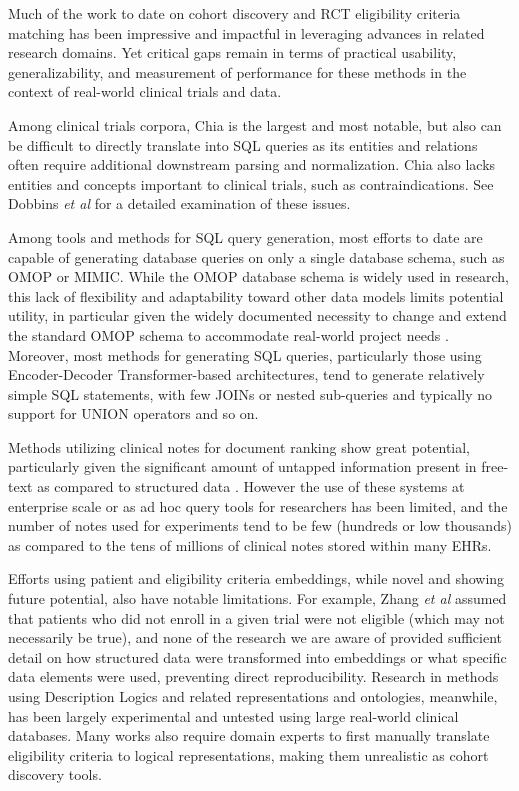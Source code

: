\documentclass[../main.tex]{subfiles}
\begin{document}
Much of the work to date on cohort discovery and RCT eligibility criteria matching has been impressive and impactful in leveraging advances in related research domains. Yet critical gaps remain in terms of practical usability, generalizability, and measurement of performance for these methods in the context of real-world clinical trials and data. 

Among clinical trials corpora, Chia is the largest and most notable, but also can be difficult to directly translate into SQL queries as its entities and relations often require additional downstream parsing and normalization. Chia also lacks entities and concepts important to clinical trials, such as contraindications. See Dobbins \textit{et al} \cite{dobbins2022leaf} for a detailed examination of these issues.

Among tools and methods for SQL query generation, most efforts to date are capable of generating database queries on only a single database schema, such as OMOP or MIMIC. While the OMOP database schema is widely used in research, this lack of flexibility and adaptability toward other data models limits potential utility, in particular given the widely documented necessity to change and extend the standard OMOP schema to accommodate real-world project needs \cite{belenkaya2021extending, peng2021towards, zoch2021adaption, warner2019hemonc, zhou2013evaluation, shin2019genomic, kwon2019development}. Moreover, most methods for generating SQL queries, particularly those using Encoder-Decoder Transformer-based architectures, tend to generate relatively simple SQL statements, with few JOINs or nested sub-queries and typically no support for UNION operators and so on.

Methods utilizing clinical notes for document ranking show great potential, particularly given the significant amount of untapped information present in free-text as compared to structured data \cite{warrer2012using}. However the use of these systems at enterprise scale or as ad hoc query tools for researchers has been limited, and the number of notes used for experiments tend to be few (hundreds or low thousands) as compared to the tens of millions of clinical notes stored within many EHRs. 

Efforts using patient and eligibility criteria embeddings, while novel and showing future potential, also have notable limitations. For example, Zhang \textit{et al} assumed that patients who did not enroll in a given trial were not eligible (which may not necessarily be true), and none of the research we are aware of provided sufficient detail on how structured data were transformed into embeddings or what specific data elements were used, preventing direct reproducibility. Research in methods using Description Logics and related representations and ontologies, meanwhile, has been largely experimental and untested using large real-world clinical databases. Many works also require domain experts to first manually translate eligibility criteria to logical representations, making them unrealistic as cohort discovery tools. 
\end{document}
